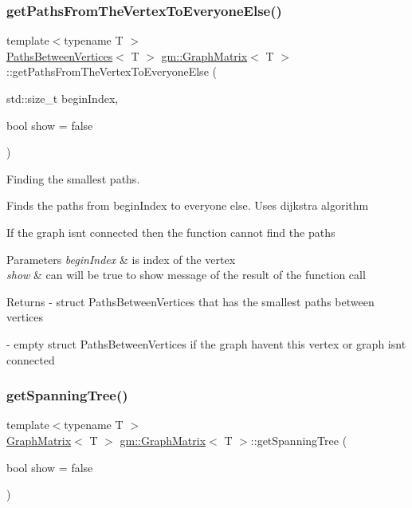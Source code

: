 \subsubsection{\texorpdfstring{get\+Paths\+From\+The\+Vertex\+To\+Everyone\+Else()}{getPathsFromTheVertexToEveryoneElse()}}
{\footnotesize\ttfamily template$<$typename T $>$ \\
\mbox{\hyperlink{structpbv_1_1_paths_between_vertices}{Paths\+Between\+Vertices}}$<$ T $>$ \mbox{\hyperlink{classgm_1_1_graph_matrix}{gm\+::\+Graph\+Matrix}}$<$ T $>$\+::get\+Paths\+From\+The\+Vertex\+To\+Everyone\+Else (\begin{DoxyParamCaption}\item[{std\+::size\+\_\+t}]{begin\+Index,  }\item[{bool}]{show = {\ttfamily false} }\end{DoxyParamCaption})}



Finding the smallest paths. 

Finds the paths from \textquotesingle{}begin\+Index\textquotesingle{} to everyone else. Uses dijkstra algorithm

If the graph isn\textquotesingle{}t connected then the function cannot find the paths


\begin{DoxyParams}{Parameters}
{\em begin\+Index} & is index of the vertex \\
\hline
{\em show} & can will be true to show message of the result of the function call \\
\hline
\end{DoxyParams}
\begin{DoxyReturn}{Returns}
-\/ \textquotesingle{}struct Paths\+Between\+Vertices\textquotesingle{} that has the smallest paths between vertices 

-\/ empty \textquotesingle{}struct Paths\+Between\+Vertices\textquotesingle{} if the graph haven\textquotesingle{}t this vertex or graph isn\textquotesingle{}t connected 
\end{DoxyReturn}
\mbox{\label{classgm_1_1_graph_matrix_a490a9ef8eb86acc75c42a97cf5dbb368}} 
\subsubsection{\texorpdfstring{get\+Spanning\+Tree()}{getSpanningTree()}}
{\footnotesize\ttfamily template$<$typename T $>$ \\
\mbox{\hyperlink{classgm_1_1_graph_matrix}{Graph\+Matrix}}$<$ T $>$ \mbox{\hyperlink{classgm_1_1_graph_matrix}{gm\+::\+Graph\+Matrix}}$<$ T $>$\+::get\+Spanning\+Tree (\begin{DoxyParamCaption}\item[{bool}]{show = {\ttfamily false} }\end{DoxyParamCaption})}



